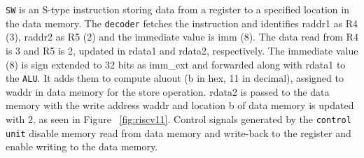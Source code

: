 \verb|SW| is an S-type instruction storing data from a register to a specified location in the data memory. The \verb|decoder| fetches the instruction and identifies raddr1 as R4 (3), raddr2 as R5 (2) and the immediate value is imm (8). The data read from R4 is 3 and R5 is 2, updated in rdata1 and rdata2, respectively. The immediate value (8) is sign extended to 32 bits as imm\_ext and forwarded along with rdata1 to the \verb|ALU|. It adds them to compute aluout (b in hex, 11 in decimal), assigned to waddr in data memory for the store operation. rdata2 is passed to the data memory with the write address waddr and location b of data memory is updated with 2, as seen in Figure ~\ref{fig:riscv11}. 
Control signals generated by the \verb|control unit| disable memory read from data memory and write-back to the register and enable writing to the data memory.
